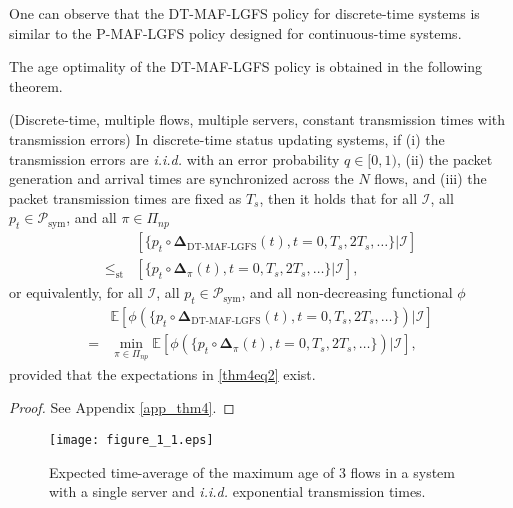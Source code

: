 One can observe that the DT-MAF-LGFS policy for discrete-time systems is similar to the P-MAF-LGFS policy designed for continuous-time systems. 

The age optimality of the DT-MAF-LGFS policy is obtained in the following theorem.







\begin{theorem}(Discrete-time, multiple flows, multiple servers, constant transmission times with transmission errors)\label{thm4}
In discrete-time status updating systems, if  (i) the transmission errors are \emph{i.i.d.} with an error probability $q\in [0,1)$, (ii)  the packet generation and arrival times are {synchronized} across the $N$ flows, and (iii) the packet transmission times are fixed as $T_s$, then it holds that for all $\mathcal{I}$, all $p_t \in\mathcal{P}_{\text{sym}}$, and all $\pi\in\Pi_{np}$ 
\begin{align}\label{thm4eq1}
&[\{p_t \circ\bm{\Delta}_{\text{DT-MAF-LGFS}}(t), t=0,T_s,2T_s,\ldots\}\vert\mathcal{I}] \nonumber\\
\leq_{\text{st}} & [\{p_t \circ\bm{\Delta}_\pi(t), t=0,T_s,2 T_s,\ldots\}\vert\mathcal{I}],
\end{align}
or equivalently, for all $\mathcal{I}$, all $p_t \in\mathcal{P}_{\text{sym}}$, and all non-decreasing functional $\phi$
 \begin{align}\label{thm4eq2}
&\mathbb{E}\left[\phi (\{p_t \circ\bm{\Delta}_{\text{DT-MAF-LGFS}}(t),t=0,T_s,2T_s,\ldots\})\vert\mathcal{I}\right] \nonumber\\
= & \min_{\pi\in\Pi_{np}} \mathbb{E}\left[\phi (\{p_t \circ\bm{\Delta}_\pi(t),t=0,T_s,2T_s,\ldots\})\vert\mathcal{I}\right],
\end{align}
provided that the expectations in \eqref{thm4eq2} exist.
\end{theorem}

\begin{proof}See Appendix \ref{app_thm4}.  \end{proof}

\begin{figure}
\centering 
\texttt{[image: figure\_1\_1.eps]} 

\caption{Expected time-average of the maximum age of 3 flows in a system with a single server and \emph{i.i.d.} exponential transmission times.}
\vspace{-5mm}
\label{fig_simulation1} 
\end{figure} 

